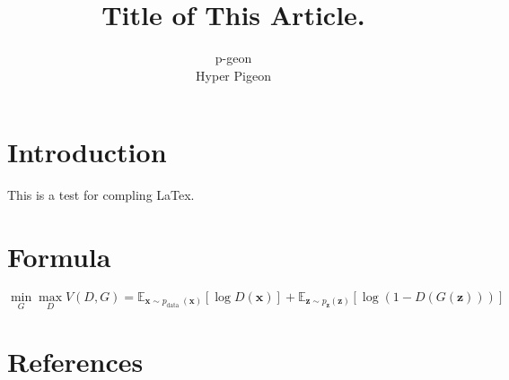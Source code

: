\documentclass[10pt,twocolumn,letterpaper]{article}
\begin{document}
\title{Title of This Article.}

\author{
p-geon\\
Hyper Pigeon
}

\maketitle
\ificcvfinal\thispagestyle{empty}\fi

%

\section{Introduction}

This is a test for compling LaTex. ~\cite{bibtest}

\section{Formula}

\[
    \min _{G} \max _{D} V(D, G)=\mathbb{E}_{\boldsymbol{x} \sim p_{\text {data }}(\boldsymbol{x})}[\log D(\boldsymbol{x})]+\mathbb{E}_{\boldsymbol{z} \sim p_{\boldsymbol{z}}(\boldsymbol{z})}[\log (1-D(G(\boldsymbol{z})))]
\]



\section{References}

{\small
% 


}
\end{document}
